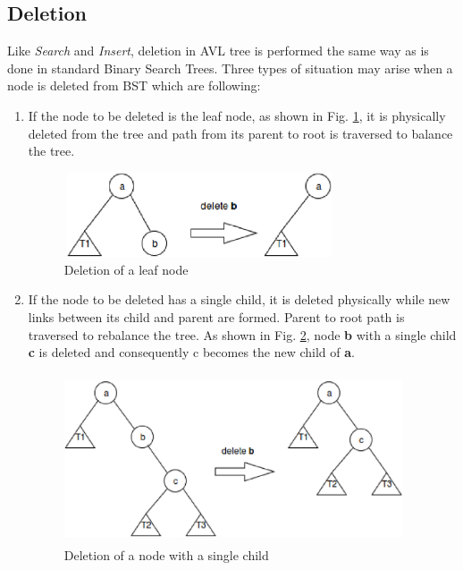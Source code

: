 \documentclass[MTech]{iitmdiss}
\begin{document}
\subsection{Deletion}
Like \textit{Search} and \textit{Insert}, deletion in AVL tree is performed the same way as is done in standard Binary Search Trees. Three types of situation may arise when a node is deleted from BST which are following:
\begin{enumerate}
\item If the node to be deleted is the leaf node, as shown in Fig. \ref{fig:leaf_delete}, it is physically deleted from the tree and path from its parent to root is traversed to balance the tree.

\begin{figure}
\centering
\includegraphics[width=8cm,height=2.5cm]{leaf_delete}
\caption{Deletion of a leaf node}
\label{fig:leaf_delete}
\end{figure}

\item If the node to be deleted has a single child, it is deleted physically while new links between its child and parent are formed. Parent to root path is traversed to rebalance the tree. As shown in Fig. \ref{fig:single_child_delete}, node \textbf{b} with a single child \textbf{c} is deleted and consequently c becomes the new child of \textbf{a}.

\begin{figure}
\centering 
\includegraphics[width=10cm,height=5cm]{single_child_delete}
\caption{Deletion of a node with a single child}
\label{fig:single_child_delete}
\end{figure}
  

\end{enumerate}
\end{document}
